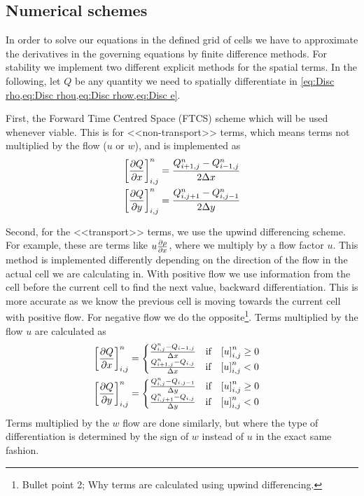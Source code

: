 \documentclass[11pt,a4paper,twocolumn,titlepage]{article}
\newcommand{\disc}[1]    %
{
\ensuremath
\qty[#1]_{i,j}^{n}
}
\begin{document}
\subsection{Numerical schemes}\label{subsec:Method/Schemes}
In order to solve our equations in the defined grid of cells we have to approximate the derivatives in the governing equations by finite difference methods. For stability we implement two different explicit methods for the spatial terms. In the following, let $Q$ be any quantity we need to spatially differentiate in \cref{eq:Disc rho,eq:Disc rhou,eq:Disc rhow,eq:Disc e}.


First, the Forward Time Centred Space (FTCS) scheme which will be used whenever viable. This is for <<non-transport>> terms, which means terms not multiplied by the flow ($u$ or $w$), and is implemented as
\begin{equation}
\begin{aligned}
\disc{\pdv{Q}{x}} &= \frac{Q^{n}_{i+1,j}-Q^{n}_{i-1,j}}{2\Delta x}
\\
\disc{\pdv{Q}{y}} &= \frac{Q^{n}_{i,j+1}-Q^{n}_{i,j-1}}{2\Delta y}
\end{aligned}
\label{eq:Central}
\end{equation}

Second, for the <<transport>> terms, we use the upwind differencing scheme. For example, these are terms like $u\pdv{\rho}{x}$, where we multiply by a flow factor $u$. This method is implemented differently depending on the direction of the flow in the actual cell we are calculating in. With positive flow we use information from the cell before the current cell to find the next value, backward differentiation. This is more accurate as we know the previous cell is moving towards the current cell with positive flow. For negative flow we do the opposite\footnote{Bullet point 2; Why terms are calculated using upwind differencing.}. Terms multiplied by the flow $u$ are calculated as
\begin{equation}
\begin{aligned}
\disc{\pdv{Q}{x}} &= \begin{cases}
\frac{Q^{n}_{i,j}-Q_{i-1,j}}{\Delta x} \qif \disc{u} \geq 0
\\
\frac{Q^{n}_{i+1,j}-Q_{i,j}}{\Delta x} \qif \disc{u} < 0
\end{cases}
\\
\disc{\pdv{Q}{y}} &=\begin{cases}
\frac{Q^{n}_{i,j}-Q_{i,j-1}}{\Delta y} \qif \disc{u} \geq 0
\\
\frac{Q^{n}_{i,j+1}-Q_{i,j}}{\Delta y} \qif \disc{u} < 0
\end{cases}
\end{aligned}
\label{eq:Upwind}
\end{equation}
Terms multiplied by the $w$ flow are done similarly, but where the type of differentiation is determined by the sign of $w$ instead of $u$ in the exact same fashion.
\end{document}
